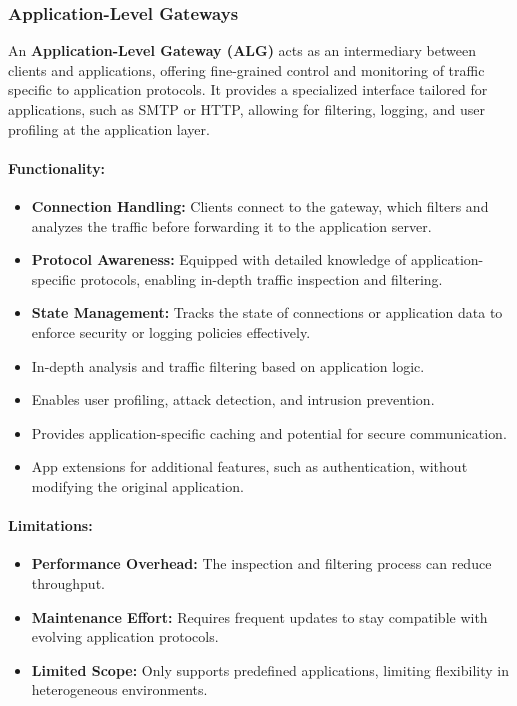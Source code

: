 \subsubsection{Application-Level Gateways}
An \textbf{Application-Level Gateway (ALG)} acts as an intermediary between clients and applications, offering fine-grained control and monitoring of traffic specific to application protocols. It provides a specialized interface tailored for applications, such as SMTP or HTTP, allowing for filtering, logging, and user profiling at the application layer.
\paragraph{Functionality:}
\begin{itemize}
    \item \textbf{Connection Handling:} Clients connect to the gateway, which filters and analyzes the traffic before forwarding it to the application server.
    \item \textbf{Protocol Awareness:} Equipped with detailed knowledge of application-specific protocols, enabling in-depth traffic inspection and filtering.
    \item \textbf{State Management:} Tracks the state of connections or application data to enforce security or logging policies effectively.
\end{itemize}
\begin{itemize}
    \item In-depth analysis and traffic filtering based on application logic.
    \item Enables user profiling, attack detection, and intrusion prevention.
    \item Provides application-specific caching and potential for secure communication.
    \item App extensions for additional features, such as authentication, without modifying the original application.
\end{itemize}
\paragraph{Limitations:}
\begin{itemize}
    \item \textbf{Performance Overhead:} The inspection and filtering process can reduce throughput.
    \item \textbf{Maintenance Effort:} Requires frequent updates to stay compatible with evolving application protocols.
    \item \textbf{Limited Scope:} Only supports predefined applications, limiting flexibility in heterogeneous environments.
\end{itemize}
